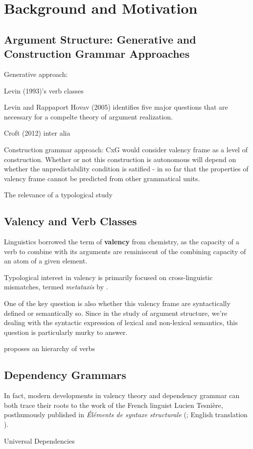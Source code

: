 \section{Background and Motivation}

\subsection{Argument Structure: Generative and Construction Grammar Approaches}


Generative approach:

Levin (1993)'s verb classes 

Levin and Rappaport Hovav (2005) identifies five major questions that are necessary for a compelte theory of argument realization.

Croft (2012) inter alia

Construction grammar approach:
CxG would consider valency frame as a level of construction. Whether or not this construction is autonomous will depend on whether the unpredictability condition is satified - in so far that the properties of valency frame cannot be predicted from other grammatical units.

The relevance of a typological study 

\subsection{Valency and Verb Classes}

Linguistics borrowed the term of \textbf{valency} from chemistry, as the capacity of a verb to combine with its arguments are reminiscent of the combining capacity of an atom of a given element.

Typological interest in valency is primarily focused on cross-linguistic mismatches, termed \textit{metataxis} by \citet{tesniere1959}.

One of the key question is also whether this valency frame are syntactically defined or semantically so. Since in the study of argument structure, we're dealing with the syntactic expression of lexical and non-lexical semantics, this question is particularly murky to answer.

\citet{tsunoda1981, tsunoda1985} proposes an hierarchy of verbs



\subsection{Dependency Grammars}
In fact, modern developments in valency theory and dependency grammar can both trace their roots to the work of the French linguist Lucien Tesnière, posthumously published in \textit{Éléments de syntaxe structurale} (\cite*{tesniere1959}; English translation \cite*{tesniere2015}).

Universal Dependencies 



